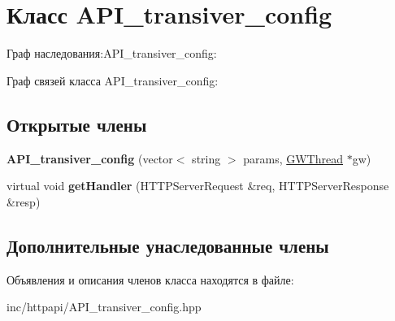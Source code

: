 \hypertarget{classAPI__transiver__config}{}\section{Класс A\+P\+I\+\_\+transiver\+\_\+config}
\label{classAPI__transiver__config}


Граф наследования\+:A\+P\+I\+\_\+transiver\+\_\+config\+:


Граф связей класса A\+P\+I\+\_\+transiver\+\_\+config\+:
\subsection*{Открытые члены}
\begin{DoxyCompactItemize}
\item 
\mbox{\label{classAPI__transiver__config_a08ba2017046aca548e454138ace4c545}} 
{\bfseries A\+P\+I\+\_\+transiver\+\_\+config} (vector$<$ string $>$ params, \hyperlink{classGWThread}{G\+W\+Thread} $\ast$gw)
\item 
\mbox{\label{classAPI__transiver__config_a87576790f15e2dc8d48a5135998dd773}} 
virtual void {\bfseries get\+Handler} (H\+T\+T\+P\+Server\+Request \&req, H\+T\+T\+P\+Server\+Response \&resp)
\end{DoxyCompactItemize}
\subsection*{Дополнительные унаследованные члены}


Объявления и описания членов класса находятся в файле\+:\begin{DoxyCompactItemize}
\item 
inc/httpapi/A\+P\+I\+\_\+transiver\+\_\+config.\+hpp\end{DoxyCompactItemize}
